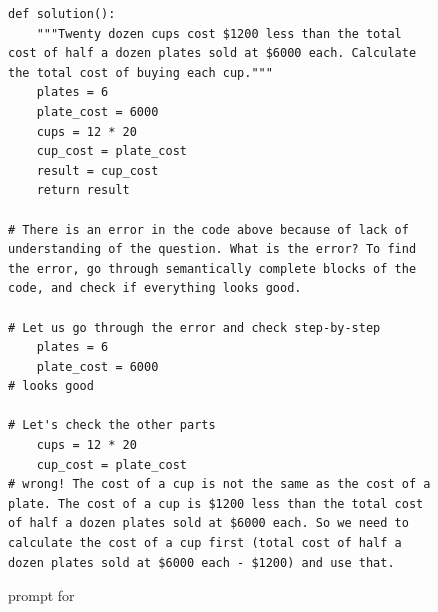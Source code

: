 \begin{figure}
    \begin{verbatim}
def solution():
    """Twenty dozen cups cost $1200 less than the total cost of half a dozen plates sold at $6000 each. Calculate the total cost of buying each cup."""
    plates = 6
    plate_cost = 6000
    cups = 12 * 20
    cup_cost = plate_cost
    result = cup_cost
    return result

# There is an error in the code above because of lack of understanding of the question. What is the error? To find the error, go through semantically complete blocks of the code, and check if everything looks good.

# Let us go through the error and check step-by-step
    plates = 6
    plate_cost = 6000
# looks good

# Let's check the other parts
    cups = 12 * 20
    cup_cost = plate_cost
# wrong! The cost of a cup is not the same as the cost of a plate. The cost of a cup is $1200 less than the total cost of half a dozen plates sold at $6000 each. So we need to calculate the cost of a cup first (total cost of half a dozen plates sold at $6000 each - $1200) and use that.
\end{verbatim}
\caption{\fbmod prompt for \gsm}
\label{fig:prompt:gsm:fb}
\end{figure}


